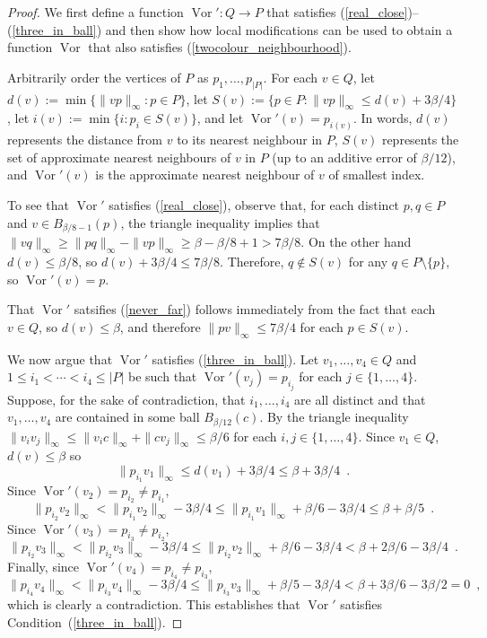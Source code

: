 \documentclass{patmorin}
\DeclareMathOperator{\vor}{Vor}
\begin{document}
\begin{proof}
  We first define a function $\vor':Q\to P$ that satisfies (\ref{real_close})--(\ref{three_in_ball}) and then show how local modifications can be used to obtain a function $\vor$ that also satisfies (\ref{twocolour_neighbourhood}).

  Arbitrarily order the vertices of $P$ as $p_1,\ldots,p_{|P|}$.  For each $v\in Q$, let $d(v):=\min\{\|vp\|_\infty:p\in P\}$, let $S(v):=\{p\in P:\|vp\|_\infty \le d(v)+3\beta/4\}$, let $i(v):=\min\{i:p_i\in S(v)\}$, and let $\vor'(v)=p_{i(v)}$.  In words, $d(v)$ represents the distance from $v$ to its nearest neighbour in $P$, $S(v)$ represents the set of approximate nearest neighbours of $v$ in $P$ (up to an additive error of $\beta/12$), and $\vor'(v)$ is the approximate nearest neighbour of $v$ of smallest index.

  To see that $\vor'$ satisfies (\ref{real_close}), observe that, for each distinct $p,q\in P$ and $v\in B_{\beta/8-1}(p)$, the triangle inequality implies that $\|vq\|_\infty \ge \|pq\|_\infty-\|vp\|_\infty \ge \beta-\beta/8+1 > 7\beta/8$.  On the other hand $d(v)\le \beta/8$, so $d(v)+3\beta/4\le 7\beta/8$.  Therefore, $q\not\in S(v)$ for any $q\in P\setminus\{p\}$, so $\vor'(v)=p$.

  That $\vor'$ satsifies (\ref{never_far}) follows immediately from the fact that each $v\in Q$, so $d(v)\le \beta$, and therefore $\|pv\|_\infty\le 7\beta/4$ for each $p\in S(v)$.

  We now argue that $\vor'$ satisfies (\ref{three_in_ball}).  Let $v_1,\ldots,v_4\in Q$ and $1\le i_1<\cdots<i_4\le|P|$ be such that $\vor'(v_j)=p_{i_j}$ for each $j\in\{1,\ldots,4\}$.  Suppose, for the sake of contradiction, that $i_1,\ldots,i_4$ are all distinct and that $v_1,\ldots,v_4$ are contained in some ball $B_{\beta/12}(c)$.  By the triangle inequality $\|v_iv_j\|_\infty \le \|v_ic\|_\infty+\|cv_j\|_\infty \le \beta/6$ for each  $i,j\in\{1,\ldots,4\}$.
  Since $v_1\in Q$, $d(v)\le\beta$ so
  \[
    \|p_{i_1}v_1\|_\infty \le d(v_1) + 3\beta/4 \le \beta + 3\beta/4 \enspace .
  \]
  Since $\vor'(v_2)=p_{i_2}\neq p_{i_1}$,
  \[
    \|p_{i_2}v_2\|_\infty
     < \|p_{i_1}v_2\|_\infty - 3\beta/4
     \le \|p_{i_1}v_1\|_\infty + \beta/6 - 3\beta/4
     \le \beta + \beta/5 \enspace .
  \]
  Since $\vor'(v_3)=p_{i_3}\neq p_{i_2}$,
  \[
     \|p_{i_2}v_3\|_\infty
     < \|p_{i_2}v_3\|_\infty - 3\beta/4
     \le \|p_{i_2}v_2\|_\infty + \beta/6 - 3\beta/4
     < \beta + 2\beta/6 - 3\beta/4 \enspace .
  \]
  Finally, since $\vor'(v_4)=p_{i_4}\neq p_{i_3}$,
  \[
    \|p_{i_4}v_4\|_\infty
    < \|p_{i_3}v_4\|_\infty - 3\beta/4
    \le \|p_{i_3}v_3\|_\infty + \beta/5 - 3\beta/4
    < \beta + 3\beta/6 - 3\beta/2 = 0 \enspace ,
  \]
  which is clearly a contradiction.  This establishes that $\vor'$ satisfies Condition~(\ref{three_in_ball}).
\end{proof}
\end{document}
